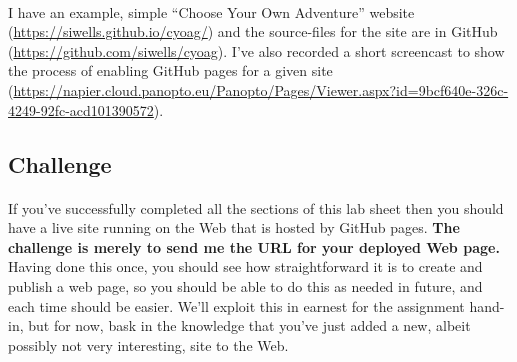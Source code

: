 \documentclass[10pt, a4paper]{article}
\begin{document}
\paragraph{} I have an example, simple ``Choose Your Own Adventure'' website (\url{https://siwells.github.io/cyoag/}) and the source-files for the site are in GitHub (\url{https://github.com/siwells/cyoag}). I've also recorded a short screencast to show the process of enabling GitHub pages for a given site (\url{https://napier.cloud.panopto.eu/Panopto/Pages/Viewer.aspx?id=9bcf640e-326c-4249-92fc-acd101390572}).



\subsection{Challenge}
\paragraph{} If you've successfully completed all the sections of this lab sheet then you should have a live site running on the Web that is hosted by GitHub pages. {\bf The challenge is merely to send me the URL for your deployed Web page.} Having done this once, you should see how straightforward it is to create and publish a web page, so you should be able to do this as needed in future, and each time should be easier. We'll exploit this in earnest for the assignment hand-in, but for now, bask in the knowledge that you've just added a new, albeit possibly not very interesting, site to the Web.





\end{document}
